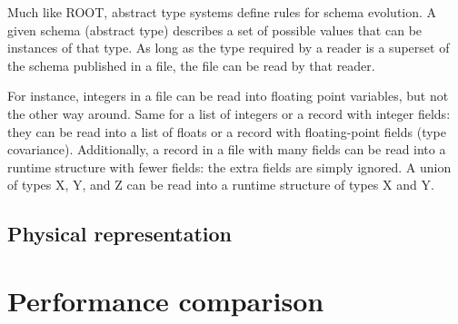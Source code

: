 \documentclass{article}
\begin{document}
Much like ROOT, abstract type systems define rules for schema evolution. A given schema (abstract type) describes a set of possible values that can be instances of that type. As long as the type required by a reader is a superset of the schema published in a file, the file can be read by that reader.

For instance, integers in a file can be read into floating point variables, but not the other way around. Same for a list of integers or a record with integer fields: they can be read into a list of floats or a record with floating-point fields (type covariance). Additionally, a record in a file with many fields can be read into a runtime structure with fewer fields: the extra fields are simply ignored. A union of types X, Y, and Z can be read into a runtime structure of types X and Y.









\subsection*{Physical representation}









\vfill
\pagebreak

\section*{Performance comparison}
\end{document}
